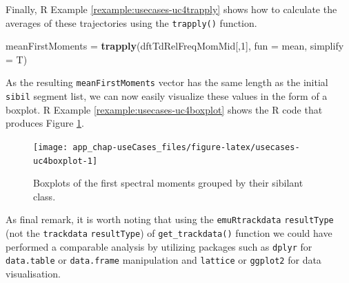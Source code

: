 \documentclass[]{book}
\newenvironment{Shaded}{\begin{snugshade}}{\end{snugshade}}
\newcommand{\CommentTok}[1]{\textcolor[rgb]{0.56,0.35,0.01}{\textit{#1}}}
\newcommand{\DataTypeTok}[1]{\textcolor[rgb]{0.13,0.29,0.53}{#1}}
\newcommand{\DecValTok}[1]{\textcolor[rgb]{0.00,0.00,0.81}{#1}}
\newcommand{\FloatTok}[1]{\textcolor[rgb]{0.00,0.00,0.81}{#1}}
\newcommand{\KeywordTok}[1]{\textcolor[rgb]{0.13,0.29,0.53}{\textbf{#1}}}
\newcommand{\NormalTok}[1]{#1}
\newcommand{\OperatorTok}[1]{\textcolor[rgb]{0.81,0.36,0.00}{\textbf{#1}}}
\newcommand{\StringTok}[1]{\textcolor[rgb]{0.31,0.60,0.02}{#1}}
\theoremstyle{definition}
\theoremstyle{definition}
\theoremstyle{definition}
\theoremstyle{remark}
\begin{document}
\begin{Shaded}
\end{Shaded}

Finally, R Example \ref{rexample:usecases-uc4trapply} shows how to
calculate the averages of these trajectories using the
\texttt{trapply()} function.

\begin{Shaded}
\begin{Highlighting}[]
\NormalTok{meanFirstMoments =}\StringTok{ }\KeywordTok{trapply}\NormalTok{(dftTdRelFreqMomMid[,}\DecValTok{1}\NormalTok{],}
                           \DataTypeTok{fun =}\NormalTok{ mean,}
                           \DataTypeTok{simplify =}\NormalTok{ T)}
\end{Highlighting}
\end{Shaded}

As the resulting \texttt{meanFirstMoments} vector has the same length as
the initial \texttt{sibil} segment list, we can now easily visualize
these values in the form of a boxplot. R Example
\ref{rexample:usecases-uc4boxplot} shows the R code that produces Figure
\ref{fig:usecases-uc4boxplot}.

\begin{Shaded}
\end{Shaded}

\begin{figure}

{\centering \texttt{[image: app\_chap-useCases\_files/figure-latex/usecases-uc4boxplot-1]} 

}

\caption{Boxplots of the first spectral moments grouped by their sibilant class.}\label{fig:usecases-uc4boxplot}
\end{figure}

As final remark, it is worth noting that using the
\texttt{emuRtrackdata} \texttt{resultType} (not the \texttt{trackdata}
\texttt{resultType}) of \texttt{get\_trackdata()} function we could have
performed a comparable analysis by utilizing packages such as
\texttt{dplyr} for \texttt{data.table} or \texttt{data.frame}
manipulation and \texttt{lattice} or \texttt{ggplot2} for data
visualisation.


\end{document}
